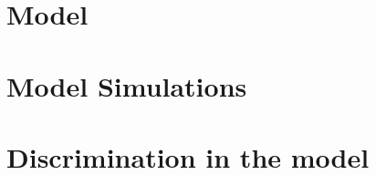 \documentclass[compress, 8pt]{beamer}
\begin{document}
\section[Model]{Model}



\miniframesoff
\section[Simulations]{Model Simulations}
\begin{frame}
    \tableofcontents[currentsection]
\end{frame}
\miniframeson



\miniframesoff
\section[Discrimination]{Discrimination in the model}
\begin{frame}
    \tableofcontents[currentsection]
\end{frame}
\miniframeson
\end{document}
